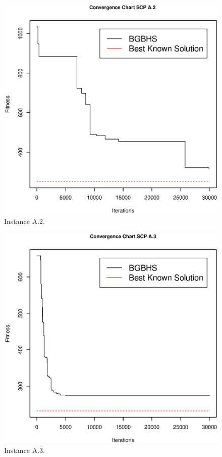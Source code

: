 \begin{figure}[]
\centering
\includegraphics[scale=.45]{Resultados/scpA2.eps}
\caption{Instance A.2.}
\label{fig:Instance.A.2}
\end{figure}

\begin{figure}[]
\centering
\includegraphics[scale=.45]{Resultados/scpA3.eps}
\caption{Instance A.3.}
\label{fig:Instance.A.3}
\end{figure}


